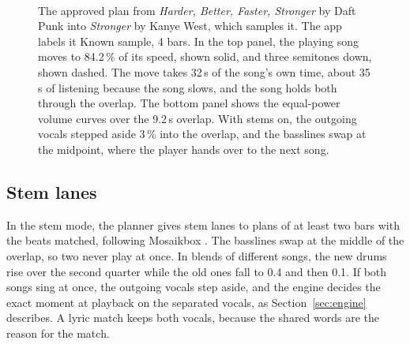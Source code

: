\documentclass[conference,a4paper]{IEEEtran}
\newcommand{\q}[1]{\textquotedbl{}#1\textquotedbl{}}
\begin{document}
\begin{figure}[t]
\\[2pt]
\caption{The approved plan from \emph{Harder, Better, Faster, Stronger} by Daft Punk into
\emph{Stronger} by Kanye West, which samples it. The app labels it \q{Known sample, 4 bars}. In the top
panel, the playing song moves to 84.2\,\% of its speed, shown solid, and three semitones down, shown
dashed. The move takes 32\,s of the song's own time, about 35\,s of listening because the song
slows, and the song holds both through the overlap. The bottom panel shows the equal-power volume
curves over the 9.2\,s overlap. With stems on, the outgoing vocals stepped aside 3\,\% into the overlap, and the
basslines swap at the midpoint, where the player hands over to the next song.}
\label{fig:timeline}
\end{figure}

\subsection{Stem lanes}
In the stem mode, the planner gives stem lanes to plans of at least two bars with the beats
matched, following Mosaikbox \cite{mosaikbox}. The basslines swap at the middle of the overlap, so
two never play at once. In blends of different songs, the new drums rise over the second quarter
while the old ones fall to 0.4 and then 0.1. If both songs sing at once, the outgoing vocals step
aside, and the engine decides the exact moment at playback on the separated vocals, as
Section~\ref{sec:engine} describes. A lyric match keeps both vocals, because the shared words are
the reason for the match.
\end{document}
